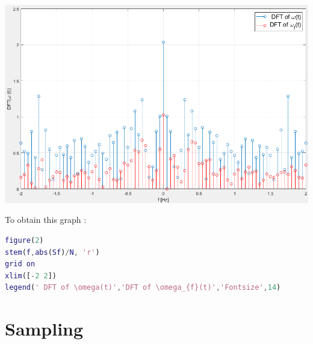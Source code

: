 \documentclass[a4paper,12pt]{article}
\begin{document}
\begin{enumerate}[label={\color{blue}\arabic*)}]
\begin{multicols}{2}
        \begin{flushleft}
            \includegraphics[scale=0.22]{Images/DFT_omega_f.png}
            \label{Figure5}
        \end{flushleft}
    \columnbreak

    To obtain this graph :
    
    \begin{lstlisting}[style=Matlab-editor,language=Matlab, basicstyle=\small\ttfamily]
figure(2)
stem(f,abs(Sf)/N, 'r')
grid on
xlim([-2 2])
legend(' DFT of \omega(t)','DFT of \omega_{f}(t)','Fontsize',14)
        \end{lstlisting}
        
    \end{multicols}
    
\end{enumerate}

\newpage
\section{Sampling}
\end{document}
